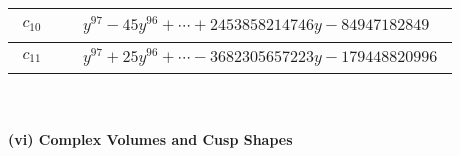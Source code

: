 \documentclass[1p]{elsarticle_modified}
\theoremstyle{definition}
\begin{document}
\begin{tabular}{m{50pt}|m{274pt}}
\hline $$\begin{aligned}c_{10}\end{aligned}$$&$\begin{aligned}
&y^{97}-45 y^{96}+\cdots+2453858214746 y-84947182849
\end{aligned}$\\
\hline $$\begin{aligned}c_{11}\end{aligned}$$&$\begin{aligned}
&y^{97}+25 y^{96}+\cdots-3682305657223 y-179448820996
\end{aligned}$\\
\hline
\end{tabular}\\~\\
\newpage\flushleft \textbf{(vi) Complex Volumes and Cusp Shapes}
\end{document}
